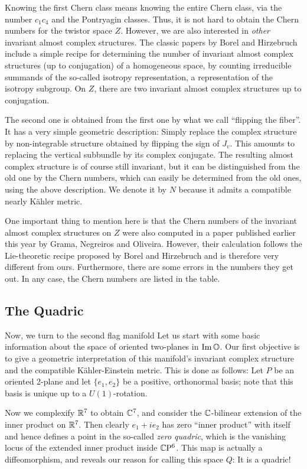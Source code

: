 \documentclass[parskip=half]{scrartcl}
\begin{document}
Knowing the first Chern class means knowing the entire Chern class, via the number $c_1c_4$ and the Pontryagin classes. Thus, it is not hard to obtain the Chern numbers for the twistor space $Z$. However, we are also interested in \emph{other} invariant almost complex structures. The classic papers by Borel and Hirzebruch include a simple recipe for determining the number of invariant almost complex structures (up to conjugation) of a homogeneous space, by counting irreducible summands of the so-called isotropy representation, a representation of the isotropy subgroup. On $Z$, there are two invariant almost complex structures up to conjugation.

The second one is obtained from the first one by what we call ``flipping the fiber''. It has a very simple geometric description: Simply replace the complex structure by non-integrable structure obtained by flipping the sign of $J_v$. This amounts to replacing the vertical subbundle by its complex conjugate. The resulting almost complex structure is of course still invariant, but it can be distinguished from the old one by the Chern numbers, which can easily be determined from the old ones, using the above description. We denote it by $N$ because it admits a compatible nearly K\"ahler metric.

One important thing to mention here is that the Chern numbers of the invariant almost complex structures on $Z$ were also computed in a paper published earlier this year by Grama, Negreiros and Oliveira. However, their calculation follows the Lie-theoretic recipe proposed by Borel and Hirzebruch and is therefore very different from ours. Furthermore, there are some errors in the numbers they get out. In any case, the Chern numbers are listed in the table. 

\subsection{The Quadric}

Now, we turn to the second flag manifold Let us start with some basic information about the space of oriented two-planes in $\operatorname{Im}\mathbb{O}$. Our first objective is to give a geometric interpretation of this manifold's invariant complex structure and the compatible K\"ahler-Einstein metric. This is done as follows: Let $P$ be an oriented 2-plane and let $\{e_1,e_2\}$ be a positive, orthonormal basis; note that this basis is unique up to a $U(1)$-rotation.

Now we complexify $\mathbb{R}^7$ to obtain $\mathbb{C}^7$, and consider the $\mathbb{C}$-bilinear extension of the inner product on $\mathbb{R}^7$. Then clearly $e_1+ie_2$ has zero ``inner product'' with itself and hence defines a point in the so-called \emph{zero quadric}, which is the vanishing locus of the extended inner product inside $\mathbb{C}\mathrm{P}^6$. This map is actually a diffeomorphism, and reveals our reason for calling this space $Q$: It is a quadric!
\end{document}
